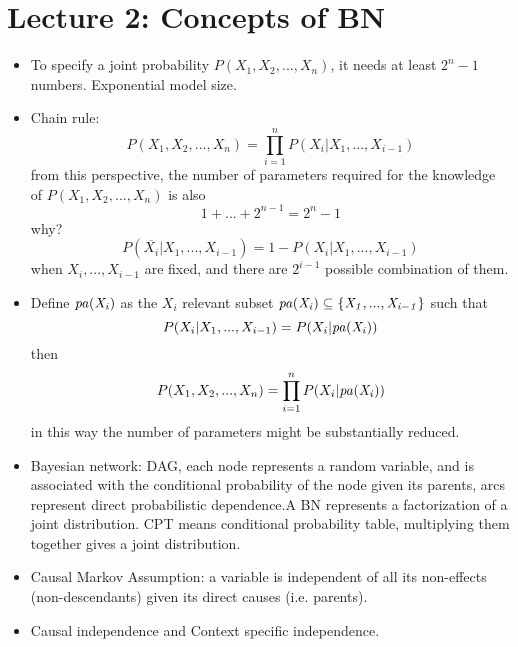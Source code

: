 
\section*{Lecture 2: Concepts of BN}

\begin{itemize}
\item To specify a joint probability $P(X_1, X_2, ..., X_n)$, it needs at least $2^n -1$ numbers. Exponential model size.
\item Chain rule: \[P(X_1, X_2, ..., X_n) = \prod_{i=1}^{n}P(X_i|X_1,...,X_{i-1})\] from this perspective, the number of parameters required for the knowledge of $P(X_1, X_2, ..., X_n)$ is also \[1 + ... + 2^{n-1} = 2^n - 1\] why? \[P(\overline{X_i}|X_1,...,X_{i-1}) = 1 - P(X_i|X_1,...,X_{i-1})\] when $X_i, ..., X_{i-1}$ are fixed, and there are $2^{i-1}$ possible combination of them.
\item Define $\it{pa}(X_i)$ as the $X_i$ relevant subset $\it{pa}(X_i)\subseteq \{X_1,...,X_{i-1}\}$ such that \[P(X_i|X_1,...,X_{i-1}) = P(X_i|\it{pa}(X_i))\] then \[P(X_1,X_2,...,X_n) = \prod_{i=1}^{n}P(X_i|\it{pa}(X_i))\] in this way the number of parameters might be substantially reduced.
\item Bayesian network: DAG, each node represents a random variable, and is associated with the conditional probability of the node given its parents, arcs represent direct probabilistic dependence.A BN represents a factorization of a joint distribution. CPT means conditional probability table, multiplying them together gives a joint distribution.
\item Causal Markov Assumption: a variable is independent of all its non-effects (non-descendants) given its direct causes (i.e. parents).
\item Causal independence and Context specific independence.
\end{itemize}
